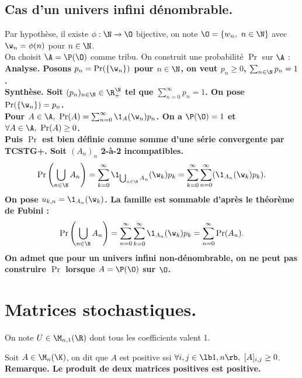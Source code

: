 \documentclass[11pt]{article}
\begin{document}
\subsection{Cas d'un univers infini dénombrable.}

Par hypothèse, il existe $\phi:\N\to\O$ bijective, on note $\O=\{w_n, ~ n\in\N\}$ avec $\w_n = \phi(n)$ pour $n\in\N$.\\
On choisit $\A=\P(\O)$ comme tribu. On construit une probabilité $\Pr$ sur $\A$ :\\
\bf{Analyse.} Posons $p_n=\Pr(\{\w_n\})$ pour $n\in\N$, on veut $p_n\geq0$, $\sum_{n\in\N}p_n=1$.\\
\bf{Synthèse.} Soit $(p_n)_{n\in\N}\in\R_+^\N$ tel que $\sum_{n=0}^{\infty}p_n=1$. On pose $\Pr(\{\w_n\})=p_n$.\\
Pour $A\in\A, ~ \Pr(A)=\sum_{n=0}^\infty \1_{A}(\w_n)p_n$. On a $\P(\O)=1$ et $\forall A \in \A, ~ \Pr(A)\geq0$.\\
Puis $\Pr$ est bien définie comme somme d'une série convergente par TCSTG+. Soit $(A_n)_n$ 2-à-2 incompatibles.
\begin{align*}
    \Pr\left( \bigcup_{n\in\N} A_n \right) = \sum_{k=0}^\infty \1_{\bigcup_{n\in\N} A_n}(\w_k)p_k =\sum_{k=0}^\infty\sum_{n=0}^\infty(\1_{A_n}(\w_k)p_k).
\end{align*}
On pose $u_{k,n} = \1_{A_n}(\w_k)$. La famille est sommable d'après le théorème de Fubini :
\begin{equation*}
    \Pr\left( \bigcup_{n\in\N} A_n \right) = \sum_{n=0}^\infty \sum_{k=0}^\infty \1_{A_n}(\w_k)p_k = \sum_{n=0}^\infty \Pr(A_n).
\end{equation*}
On admet que pour un univers infini non-dénombrable, on ne peut pas construire $\Pr$ lorsque $A=\P(\O)$ sur $\O$.

\section{Matrices stochastiques.}

On note $U\in\M_{n,1}(\R)$ dont tous les coefficients valent 1.

\begin{defi}{}{}
    Soit $A\in\M_n(\K)$, on dit que $A$ est positive ssi $\forall i,j \in \lb1,n\rb, ~ [A]_{i,j}\geq 0$.\\
    \bf{Remarque.} Le produit de deux matrices positives est positive.
\end{defi}

\vspace*{-0.8cm}
\end{document}
